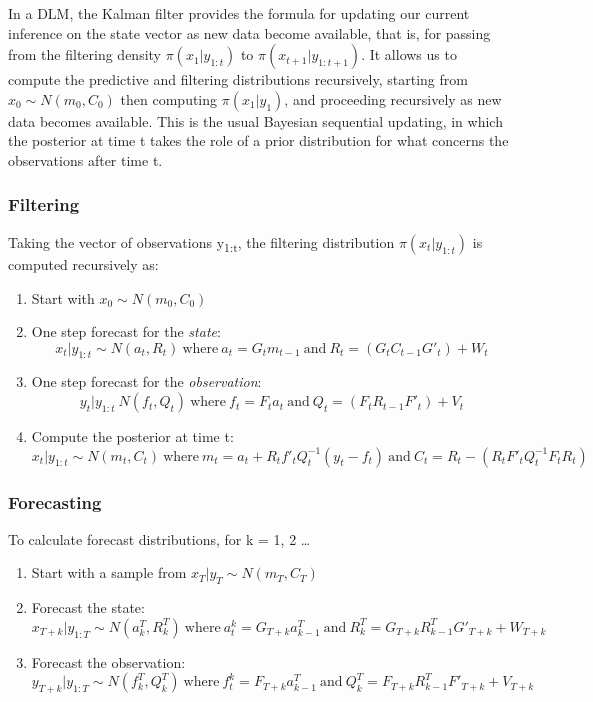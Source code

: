 \documentclass[a4paper,12pt]{article}
\begin{document}
In a DLM, the Kalman filter provides the formula for updating our current inference on the state vector as new data become available, that is, for passing from the filtering density \(\pi(x_{1}|y_{1:t})\) to \(\pi(x_{t+1}|y_{1:t+1})\). It allows us to compute the predictive and filtering distributions recursively, starting from \(x_{0} \sim N(m_{0}, C_{0})\) then computing \(\pi(x_{1}|y_{1})\), and proceeding recursively as new data becomes available. This is the usual Bayesian sequential updating, in which the posterior at time t takes the role of a prior distribution for what concerns the observations after time t.
\subsubsection{Filtering}
\label{sec:org40e7a21}
Taking the vector of observations y\textsubscript{1:t}, the filtering distribution \(\pi(x_{t}|y_{1:t})\) is computed recursively as:
\begin{enumerate}
\item Start with \(x_{0} \sim N(m_{0}, C_{0})\)
\item One step forecast for the \emph{state}:
\[
    x_{t}|y_{1:t} \sim N(a_{t}, R_{t})\ \text{where}\ a_{t} = G_{t}m_{t-1}\ \text{and}\ R_{t} = (G_{t}C_{t-1}G'_{t}) + W_{t}
   \]
\item One step forecast for the \emph{observation}:
\[
    y_{t}|y_{1:t} ~ N(f_{t}, Q_{t})\ \text{where}\ f_{t} = F_{t}a_{t}\ \text{and}\ Q_{t} = (F_{t}R_{t-1}F'_{t}) + V_{t}
   \]
\item Compute the posterior at time t:
\[
    x_{t} | y_{1:t} \sim N(m_{t}, C_{t})\ \text{where}\ m_{t} = a_{t}+R_{t}f'_{t}Q^{-1}_{t}(y_{t}-f_{t})\ \text{and}\ C_{t} = R_{t} - (R_{t}F'_{t}Q^{-1}_{t}F_{t}R_{t})
   \]
\end{enumerate}
\pagebreak
\subsubsection{Forecasting}
\label{sec:org0fc433f}
To calculate forecast distributions, for k = 1, 2 \ldots{}
\begin{enumerate}
\item Start with a sample from \(x_{T} | y_{T} \sim N(m_{T}, C_{T})\)
\item Forecast the state:
\[
            x_{T+k} | y_{1:T} \sim N(a_{k}^T, R_{k}^T)\ \text{where}\ a_{t}^k = G_{T+k}a^{T}_{k-1}\ \text{and}\ R_{k}^T = G_{T+k}R^{T}_{k-1}G'_{T+k} + W_{T+k}
    \]
\item Forecast the observation:
\[
            y_{T+k} | y_{1:T} \sim N(f_{k}^T, Q_{k}^T)\ \text{where}\ f_{t}^k = F_{T+k}a^{T}_{k-1}\ \text{and}\ Q_{k}^T = F_{T+k}R^{T}_{k-1}F'_{T+k} + V_{T+k}
         \]
\end{enumerate}
\end{document}
